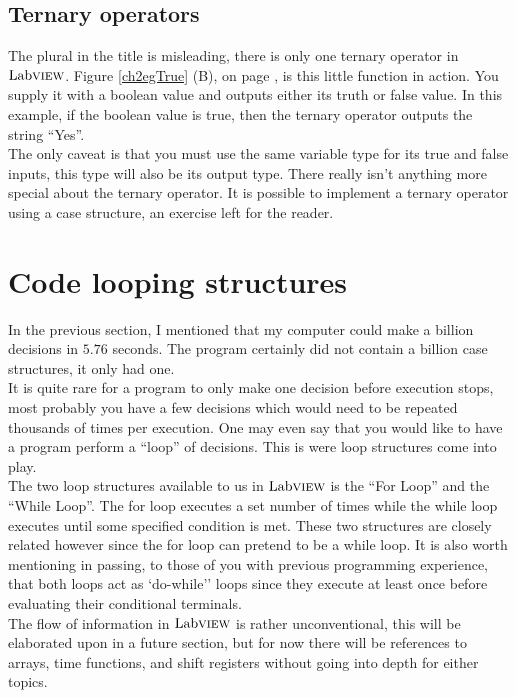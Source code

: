 \subsection{Ternary operators}
The plural in the title is misleading, there is only one ternary operator in $\text{Lab}\textsc{view}$. Figure \ref{ch2egTrue} (B), on page \pageref{ch2egTrue}, is this little function in action. You supply it with a boolean value and outputs either its truth or false value. In this example, if the boolean value is true, then the ternary operator outputs the string ``Yes''.\\

The only caveat is that you must use the same variable type for its true and false inputs, this type will also be its output type.  There really isn't anything more special about the ternary operator. It is possible to implement a ternary operator using a case structure, an exercise left for the reader.

\section{Code looping structures}
In the previous section, I mentioned that my computer could make a billion decisions in $5.76$ seconds. The program certainly did not contain a billion case structures, it only had one.\\

It is quite rare for a program to only make one decision before execution stops, most probably you have a few decisions which would need to be repeated thousands of times per execution. One may even say that you would like to have a program perform a ``loop'' of decisions. This is were loop structures come into play.\\

The two loop structures available to us in $\text{Lab}\textsc{view}$ is the ``For Loop'' and the ``While Loop''. The for loop executes a set number of times while the while loop executes until some specified condition is met. These two structures are closely related however since the for loop can pretend to be a while loop. It is also worth mentioning in passing, to those of you with previous programming experience, that both loops act as `do-while'' loops since they execute at least once before evaluating their conditional terminals.\\

The flow of information in $\text{Lab}\textsc{view}$ is rather unconventional, this will be elaborated upon in a future section, but for now there will be references to arrays, time functions, and shift registers without going into depth for either topics.

